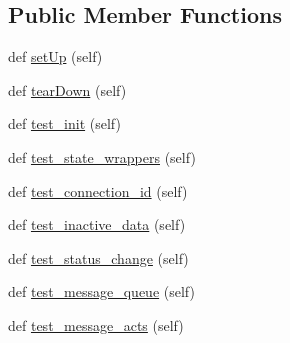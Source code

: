 \subsection*{Public Member Functions}
\begin{DoxyCompactItemize}
\item 
def \hyperlink{classparlai_1_1mturk_1_1core_1_1legacy__2018_1_1test_1_1test__mturk__agent_1_1TestMTurkAgent_acf817e32b90b835347cdddc019b90b15}{set\+Up} (self)
\item 
def \hyperlink{classparlai_1_1mturk_1_1core_1_1legacy__2018_1_1test_1_1test__mturk__agent_1_1TestMTurkAgent_a7a8fde13675083b70c386a1572907040}{tear\+Down} (self)
\item 
def \hyperlink{classparlai_1_1mturk_1_1core_1_1legacy__2018_1_1test_1_1test__mturk__agent_1_1TestMTurkAgent_aefc023b6bc037dfa7450a4b07721e1ef}{test\+\_\+init} (self)
\item 
def \hyperlink{classparlai_1_1mturk_1_1core_1_1legacy__2018_1_1test_1_1test__mturk__agent_1_1TestMTurkAgent_aae09a73d8a3a81db8bbd0a03f45948ab}{test\+\_\+state\+\_\+wrappers} (self)
\item 
def \hyperlink{classparlai_1_1mturk_1_1core_1_1legacy__2018_1_1test_1_1test__mturk__agent_1_1TestMTurkAgent_a37efa552f4eceee94c74a3203e1a629c}{test\+\_\+connection\+\_\+id} (self)
\item 
def \hyperlink{classparlai_1_1mturk_1_1core_1_1legacy__2018_1_1test_1_1test__mturk__agent_1_1TestMTurkAgent_a9b5a89daa42f7c6b978912c5cdb2d558}{test\+\_\+inactive\+\_\+data} (self)
\item 
def \hyperlink{classparlai_1_1mturk_1_1core_1_1legacy__2018_1_1test_1_1test__mturk__agent_1_1TestMTurkAgent_af125929ec3a33b4e9a631f2c89f3460a}{test\+\_\+status\+\_\+change} (self)
\item 
def \hyperlink{classparlai_1_1mturk_1_1core_1_1legacy__2018_1_1test_1_1test__mturk__agent_1_1TestMTurkAgent_a6ff1c8e1a13eba40115b08e7d1267de1}{test\+\_\+message\+\_\+queue} (self)
\item 
def \hyperlink{classparlai_1_1mturk_1_1core_1_1legacy__2018_1_1test_1_1test__mturk__agent_1_1TestMTurkAgent_a0835afc555b43ee116569e8c8e6aee6c}{test\+\_\+message\+\_\+acts} (self)
\end{DoxyCompactItemize}
